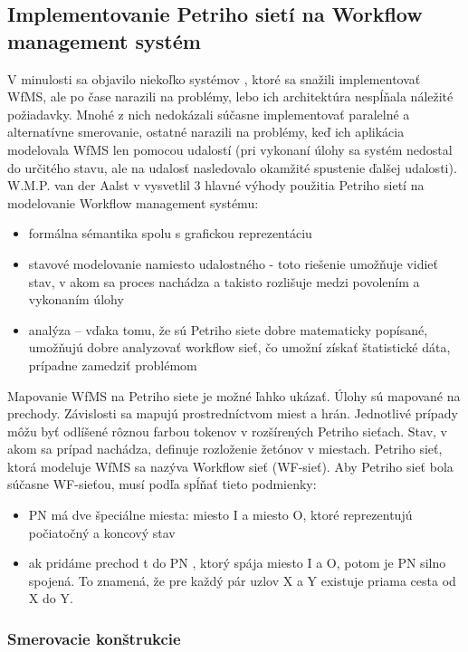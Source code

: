 \subsection{Implementovanie Petriho sietí na Workflow management systém}
\label{kap:teoria_petriho_siete_na_workflow}
V minulosti sa objavilo niekoľko systémov , ktoré sa snažili implementovať WfMS, ale po čase narazili na problémy, lebo ich architektúra nespĺňala náležité požiadavky. Mnohé z nich nedokázali súčasne implementovať paralelné a alternatívne smerovanie, ostatné narazili na problémy, keď ich aplikácia modelovala WfMS len pomocou udalostí (pri vykonaní úlohy sa systém nedostal do určitého stavu, ale na udalosť nasledovalo okamžité spustenie ďalšej udalosti).
W.M.P. van der Aalst v \cite{workflow_vyhody}
vysvetlil 3 hlavné výhody použitia Petriho sietí na modelovanie Workflow management systému:
\begin{itemize}
	\item formálna sémantika spolu s grafickou reprezentáciu
	\item stavové modelovanie namiesto udalostného - toto riešenie umožňuje vidieť stav, v akom sa proces nachádza a takisto rozlišuje medzi povolením a vykonaním úlohy  %
	\item analýza – vďaka tomu, že sú Petriho siete dobre matematicky popísané, umožňujú dobre analyzovať workflow sieť, čo umožní získať štatistické dáta, prípadne zamedziť problémom
\end{itemize}

Mapovanie WfMS na Petriho siete je možné ľahko ukázať. Úlohy sú mapované na prechody. Závislosti sa mapujú prostredníctvom miest a hrán. Jednotlivé prípady môžu byť odlíšené rôznou farbou tokenov v rozšírených Petriho sieťach. Stav, v akom sa prípad nachádza, definuje rozloženie žetónov v miestach.
Petriho sieť, ktorá modeluje WfMS sa nazýva Workflow sieť (WF-sieť). Aby Petriho sieť bola súčasne WF-sieťou, musí podľa \cite{workflow_systemy} spĺňať tieto podmienky:
\begin{itemize}
	\item PN má dve špeciálne miesta: miesto I a miesto O, ktoré reprezentujú počiatočný a koncový stav 
	\item  ak pridáme prechod t do PN , ktorý spája miesto I a O, potom je PN silno spojená. To znamená, že pre každý pár uzlov X a Y  existuje priama cesta od X do Y. 
\end{itemize}

\subsubsection{Smerovacie konštrukcie}

